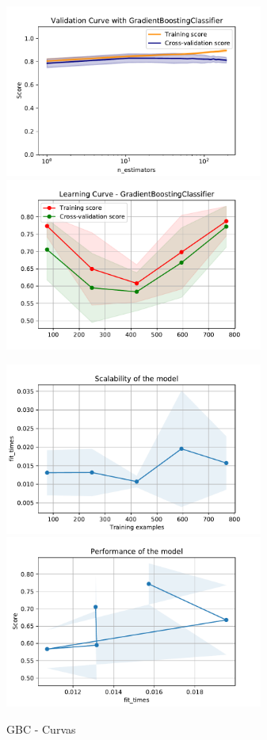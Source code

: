 \documentclass[12pt,twoside]{report}
\begin{document}
\begin{figure}[ht!]
\begin{multicols}{2}
\includegraphics[width=8.5cm]{./code/figures_python/validation_curves/gbc.pdf}%
\columnbreak
\includegraphics[width=8.5cm]{./code/figures_python/learning_curves/gbc.pdf}%
\end{multicols}

\begin{multicols}{2}
\includegraphics[width=8.5cm]{./code/figures_python/learning_curves/gbc_scalability.pdf}%
\columnbreak
\includegraphics[width=8.5cm]{./code/figures_python/learning_curves/gbc_performance.pdf}%
\end{multicols}
\caption{GBC - Curvas}
\label{gbc:curves}
\end{figure}
\end{document}
